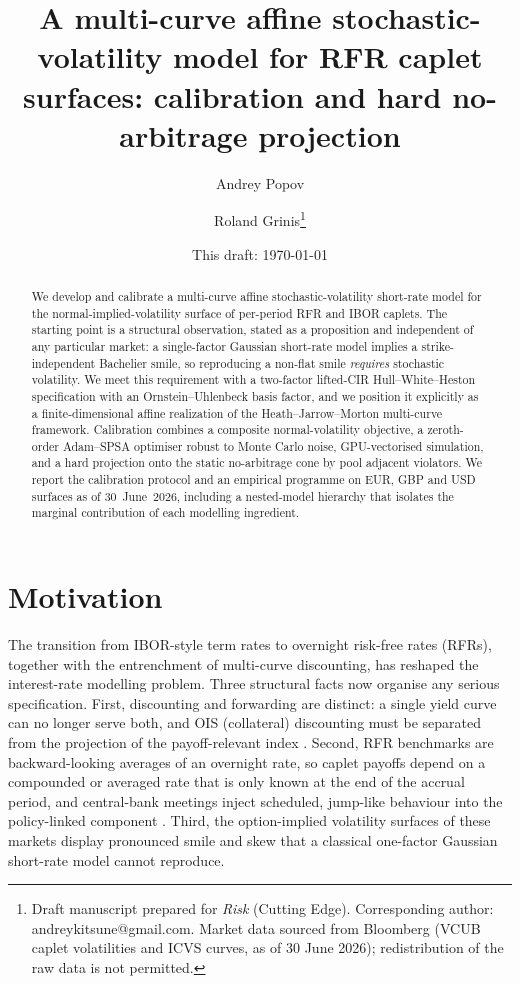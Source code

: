 \documentclass[11pt]{article}
\title{\bfseries A multi-curve affine stochastic-volatility model for
RFR caplet surfaces: calibration and hard no-arbitrage projection}
\author{Andrey Popov \and Roland Grinis\thanks{Draft manuscript prepared for
\emph{Risk} (Cutting Edge). Corresponding author: andreykitsune@gmail.com.
Market data sourced from Bloomberg (VCUB caplet volatilities and ICVS curves,
as of 30 June 2026); redistribution of the raw data is not permitted.}}
\date{This draft: \today}
\theoremstyle{plain}
\theoremstyle{definition}
\begin{document}
\maketitle

\begin{abstract}
\noindent
We develop and calibrate a multi-curve affine stochastic-volatility short-rate
model for the normal-implied-volatility surface of per-period RFR and IBOR
caplets. The starting point is a structural observation, stated as a
proposition and independent of any particular market: a single-factor Gaussian
short-rate model implies a strike-independent Bachelier smile, so reproducing a
non-flat smile \emph{requires} stochastic volatility. We meet this requirement
with a two-factor lifted-CIR Hull--White--Heston specification with an
Ornstein--Uhlenbeck basis factor, and we position it explicitly as a
finite-dimensional affine realization of the Heath--Jarrow--Morton multi-curve
framework. Calibration combines a composite normal-volatility objective, a
zeroth-order Adam--SPSA optimiser robust to Monte Carlo noise, GPU-vectorised
simulation, and a hard projection onto the static no-arbitrage cone by pool
adjacent violators. We report the calibration protocol and an empirical
programme on EUR, GBP and USD surfaces as of 30~June~2026, including a
nested-model hierarchy that isolates the marginal contribution of each
modelling ingredient.
\end{abstract}

\section{Motivation}

The transition from IBOR-style term rates to overnight risk-free rates (RFRs),
together with the entrenchment of multi-curve discounting, has reshaped the
interest-rate modelling problem. Three structural facts now organise any
serious specification. First, discounting and forwarding are distinct: a single
yield curve can no longer serve both, and OIS (collateral) discounting must be
separated from the projection of the payoff-relevant index
\citep{Henrard2014,GrbacRunggaldier2016}. Second, RFR benchmarks are
backward-looking averages of an overnight rate, so caplet payoffs depend on a
compounded or averaged rate that is only known at the end of the accrual period,
and central-bank meetings inject scheduled, jump-like behaviour into the
policy-linked component \citep{FGGS2020,FGS2023}. Third, the option-implied
volatility surfaces of these markets display pronounced smile and skew that a
classical one-factor Gaussian short-rate model cannot reproduce.
\end{document}
